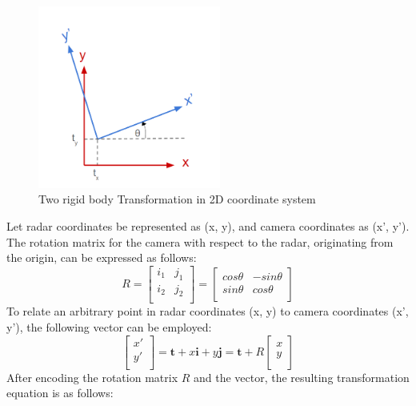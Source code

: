 \begin{figure}[hpbt]
    \centering
    \includegraphics[width=6cm]{Figures/transformation.png}%
    \caption{Two rigid body Transformation in 2D coordinate system}
    \label{fig:transformation_figure}
\end{figure}
Let radar coordinates be represented as (x, y), 
and camera coordinates as (x', y'). 
The rotation matrix for the camera with respect to the radar, 
originating from the origin, can be expressed as follows:
\begin{equation}\label{equ:2d_rotation_eq}
    R=
    \begin{bmatrix}
        i_1 & j_1\\
        i_2 & j_2\\
        \end{bmatrix}=
    \begin{bmatrix}
    cos\theta & -sin\theta\\
    sin\theta & cos\theta\\
    \end{bmatrix}
\end{equation}
To relate an arbitrary point in radar coordinates (x, y) to camera coordinates (x', y'), 
the following vector can be employed:
\begin{equation}\label{equ:2d_vector_eq}
    \begin{bmatrix}
        x'\\ 
        y'\\
    \end{bmatrix}=
    \mathbf{t}+x\mathbf{i}+y\mathbf{j}=\mathbf{t}+R
    \begin{bmatrix}
    x\\
    y\\
    \end{bmatrix}
\end{equation}
After encoding the rotation matrix $R$ and the vector, the resulting transformation equation is as follows:

